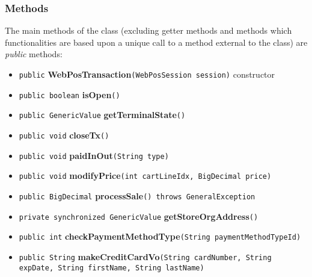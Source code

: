 \subsubsection{Methods}

The main methods of the class (excluding getter methods and methods which functionalities are based upon a unique call to a method external to the class) are \emph{public} methods:

\begin{itemize}
	\item \texttt{public} \textbf{WebPosTransaction}\texttt{(WebPosSession session)} constructor \\
	\item \texttt{public boolean} \textbf{isOpen}\texttt{()} \\
	\item \texttt{public GenericValue} \textbf{getTerminalState}\texttt{()} \\
	\item \texttt{public void} \textbf{closeTx}\texttt{()} \\
   \item \texttt{public void} \textbf{paidInOut}\texttt{(String type)} \\
   \item \texttt{public void} \textbf{modifyPrice}\texttt{(int cartLineIdx, BigDecimal price)} \\
   \item \texttt{public BigDecimal} \textbf{processSale}\texttt{() throws GeneralException} \\
   \item \texttt{private synchronized GenericValue} \textbf{getStoreOrgAddress}\texttt{()} \\
   \item \texttt{public int} \textbf{checkPaymentMethodType}\texttt{(String paymentMethodTypeId)} \\
   \item \texttt{public String} \textbf{makeCreditCardVo}\texttt{(String cardNumber, String expDate, String firstName, String lastName)} \\
\end{itemize}